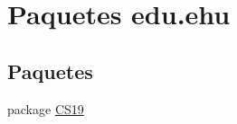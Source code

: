 \hypertarget{a00019}{}\section{Paquetes edu.\+ehu}
\label{a00019}
\subsection*{Paquetes}
\begin{DoxyCompactItemize}
\item 
package \mbox{\hyperlink{a00020}{C\+S19}}
\end{DoxyCompactItemize}
